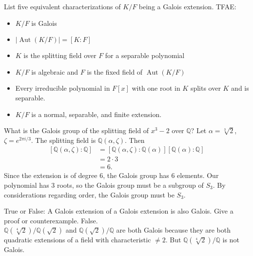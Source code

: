 \documentclass[avery5371,grid]{flashcards}
\newcommand{\Q}{\mathbb{Q}}
\DeclareMathOperator{\Aut}{Aut}
\begin{document}
\begin{flashcard}[Fields]{List five equivalent characterizations of $K/F$ being a Galois extension.}
 TFAE:
 \begin{itemize}
      \item $K/F$ is Galois
      \item $|\Aut(K/F)| = [K:F]$
      \item $K$ is the splitting field over $F$ for a separable polynomial
      \item $K/F$ is algebraic and $F$ is the fixed field of $\Aut(K/F)$
      \item Every irreducible polynomial in $F[x]$ with one root in $K$ splits over $K$ and is separable.
      \item $K/F$ is a normal, separable, and finite extension.
 \end{itemize}

\end{flashcard}

\begin{flashcard}[Fields]{What is the Galois group of the splitting field of $x^3 - 2$ over $\Q$?}
 Let $\alpha = \sqrt[3]{2}$, $\zeta = e^{2 \pi i/3}$. The splitting field is $\Q(\alpha, \zeta)$. Then
 $$\begin{array}{cl}
      [\Q(\alpha, \zeta):\Q] & = [\Q(\alpha, \zeta):\Q(\alpha)][\Q(\alpha):\Q] \\
      & = 2 \cdot 3 \\
      & = 6.
 \end{array}$$
 Since the extension is of degree 6, the Galois group has 6 elements. Our polynomial has 3 roots, so the Galois group must be a subgroup of $S_3$. By considerations regarding order, the Galois group must be $S_3$.
\end{flashcard}

\begin{flashcard}[Fields]{True or False: A Galois extension of a Galois extension is also Galois. Give a proof or counterexample.}
 False. \\
 
 $\Q(\sqrt[4]{2})/\Q(\sqrt{2})$ and $\Q(\sqrt{2})/\Q$ are both Galois because they are both quadratic extensions of a field with characteristic $\neq 2$. But $\Q(\sqrt[4]{2})/\Q$ is not Galois.
\end{flashcard}
\end{document}
